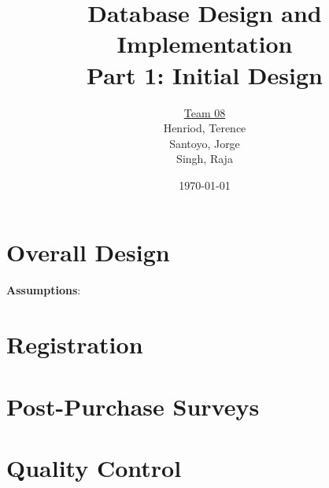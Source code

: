 \documentclass{article}
\title{Database Design and Implementation \\ Part 1: Initial Design}
\author{\underline{Team 08}\\Henriod, Terence\\Santoyo, Jorge \\Singh, Raja}
\date{\today}
\begin{document}
\clearpage
\maketitle
\thispagestyle{empty} %

\begin{abstract} %

\end{abstract}
%
%
%
\newpage
\section{Overall Design}

\textbf{Assumptions}:
\begin{itemize}
\end{itemize}
%
%
%
\section{Registration}
%
%
%
\section{Post-Purchase Surveys}
%
%
%
\section{Quality Control}
\end{document}
